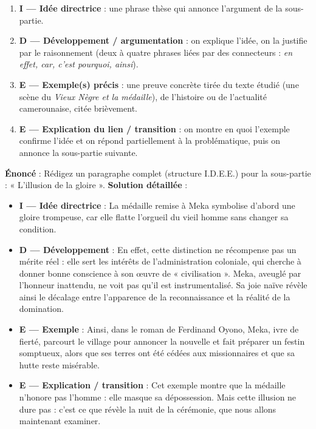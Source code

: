 \documentclass[11pt]{article}
\begin{document}
\begin{methode}
\begin{enumerate}
\item \textbf{I — Idée directrice} : une phrase thèse qui annonce l'argument de la sous-partie.
\item \textbf{D — Développement / argumentation} : on explique l'idée, on la justifie par le raisonnement (deux à quatre phrases liées par des connecteurs : \emph{en effet, car, c'est pourquoi, ainsi}).
\item \textbf{E — Exemple(s) précis} : une preuve concrète tirée du texte étudié (une scène du \emph{Vieux Nègre et la médaille}), de l'histoire ou de l'actualité camerounaise, citée brièvement.
\item \textbf{E — Explication du lien / transition} : on montre en quoi l'exemple confirme l'idée et on répond partiellement à la problématique, puis on annonce la sous-partie suivante.
\end{enumerate}
\end{methode}

\begin{exoresolu}
\textbf{Énoncé} : Rédigez un paragraphe complet (structure I.D.E.E.) pour la sous-partie : « L'illusion de la gloire ».
\tcblower
\textbf{Solution détaillée} :
\begin{itemize}
\item \textbf{I — Idée directrice} : La médaille remise à Meka symbolise d'abord une gloire trompeuse, car elle flatte l'orgueil du vieil homme sans changer sa condition.
\item \textbf{D — Développement} : En effet, cette distinction ne récompense pas un mérite réel : elle sert les intérêts de l'administration coloniale, qui cherche à donner bonne conscience à son œuvre de « civilisation ». Meka, aveuglé par l'honneur inattendu, ne voit pas qu'il est instrumentalisé. Sa joie naïve révèle ainsi le décalage entre l'apparence de la reconnaissance et la réalité de la domination.
\item \textbf{E — Exemple} : Ainsi, dans le roman de Ferdinand Oyono, Meka, ivre de fierté, parcourt le village pour annoncer la nouvelle et fait préparer un festin somptueux, alors que ses terres ont été cédées aux missionnaires et que sa hutte reste misérable.
\item \textbf{E — Explication / transition} : Cet exemple montre que la médaille n'honore pas l'homme : elle masque sa dépossession. Mais cette illusion ne dure pas : c'est ce que révèle la nuit de la cérémonie, que nous allons maintenant examiner.
\end{itemize}
\end{exoresolu}
\end{document}
